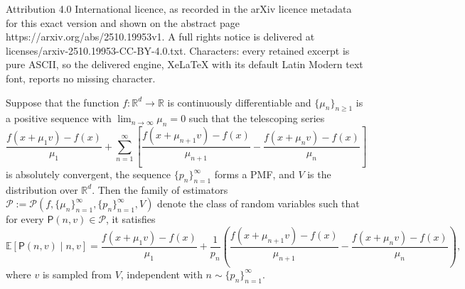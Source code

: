 \documentclass[10pt,a4paper]{amsart}
\newcommand{\EE}{\mathbb{E}}
\newcommand{\RR}{\mathbb{R}}
\begin{document}
Attribution 4.0 International licence, as recorded in the arXiv licence metadata for this exact version and shown on the abstract page https://arxiv.org/abs/2510.19953v1. A full rights notice is delivered at licenses/arxiv-2510.19953-CC-BY-4.0.txt. Characters: every retained excerpt is pure ASCII, so the delivered engine, XeLaTeX with its default Latin Modern text font, reports no missing character.
\begin{definition} \label{def:unbiased-family}
Suppose that the function $f:\RR^d\to \RR$ is  continuously differentiable and  $\{\mu_n\}_{n\ge1}$ is a positive sequence with $\lim_{n\to\infty}\mu_n=0$ such that the telescoping series
\[
\frac{f(x+\mu_1 v)-f(x)}{\mu_1} + \sum_{n=1}^\infty \left[ \frac{f(x+\mu_{n+1} v)-f(x)}{\mu_{n+1}}-\frac{f(x+\mu_n v)-f(x)}{\mu_n}\right]
\]
is absolutely convergent, the sequence $\{p_n\}_{n=1}^\infty$ forms a PMF, and $V$ is the distribution over $\RR^d$. Then the family of estimators $\mathscr{P}:=\mathscr{P}(f, \{ \mu_n\}_{n=1}^\infty, \{ p_n\}_{n=1}^\infty,V)$ denote the class of random variables such that for every $\mathsf{P}(n,v) \in \mathscr{P}$, it satisfies
    $$\EE[\mathsf{P}(n,v)\mid n,v]= \frac{f(x+\mu_1 v) - f(x)}{\mu_1} + \frac{1}{p_n}\left( \frac{f(x+\mu_{n+1} v) - f(x)}{\mu_{n+1}} - \frac{f(x+\mu_n v) - f(x)}{\mu_n}\right),$$
    where $v$ is sampled from $V$,  independent with $n\sim \{ p_n\}_{n=1}^\infty$. 
\end{definition} 
\end{document}

